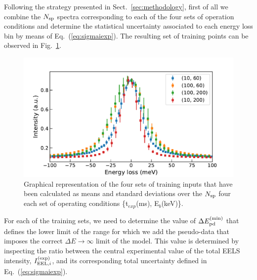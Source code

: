 Following the strategy presented in Sect.~\ref{sec:methodology}, first of all we combine the $N_{\rm sp}$ spectra
corresponding to each of the four sets of operation conditions and determine the statistical uncertainty
associated to each energy loss bin by means of Eq.~(\ref{eq:sigmaiexp}).
%
The resulting set of training points can be observed in Fig.~\ref{fig:training_points_vacuum}.

\begin{figure}[H]
    \centering
    \includegraphics[width=120mm]{plots/training_points_vacuum.pdf}
    \caption{Graphical representation of the four sets of training inputs
    that have been calculated as means and standard deviations over the
    $N_{\rm sp}$ four each set of operating conditions \{t$_{exp}$(ms), E$_b$(keV)\}.
      }
\label{fig:training_points_vacuum}
\end{figure}

For each of the training sets, we need to determine the value of $\Delta E_{\rm pd}^{\rm (min)}$
that defines the lower limit of the range for which we add the pseudo-data
that imposes the correct $\Delta E \to \infty$ limit of the model.
%
This value is determined
by inspecting the ratio between the central experimental value of the total
EELS intensity, $I_{{\rm EEL},i}^{(\rm exp)}$, and its corresponding
total uncertainty defined in Eq.~(\ref{eq:sigmaiexp}).

